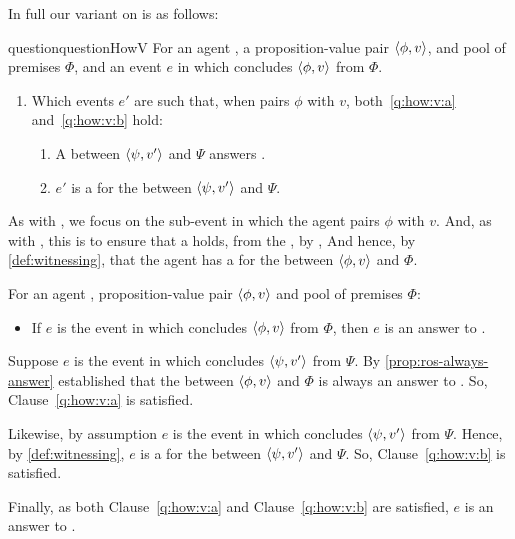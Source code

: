\begin{note}
  In full our variant on \qHow{} is as follows:

  \begin{restatable}[\qHowV{}]{question}{questionHowV}
    \label{q:how:v}
    For an agent \vAgent{}, a proposition-value pair \(\langle \phi, v \rangle\), and pool of premises \(\Phi\), and an event \(e\) in which \vAgent{} concludes \(\langle \phi, v \rangle\) from \(\Phi\).

    \begin{enumerate}[label=]
    \item
      Which events \(e'\) are such that, when \vAgent{} pairs \(\phi\) with \(v\), both~\ref{q:how:v:a} and~\ref{q:how:v:b} hold:
      \begin{enumerate}[label=\alph*., ref=(\alph*), , series=qHowVdef]
      \item
        \label{q:how:v:a}
        A \ros{} between \(\langle \psi, v' \rangle\) and \(\Psi\) answers \qWhyVnP{}.
      \item
        \label{q:how:v:b}
        \(e'\) is a  for the \ros{} between \(\langle \psi, v' \rangle\) and \(\Psi\).
      \end{enumerate}
    \end{enumerate}
    \vspace{-\baselineskip}
  \end{restatable}

  As with \qWhyVnP{}, we focus on the sub-event in which the agent pairs \(\phi\) with \(v\).
  And, as with \qWhyVnP{}, this is to ensure that a \ros{} holds, from the \agpe{}, by \supportI{},
  And hence, by \autoref{def:witnessing}, that the agent has a \wit{} for the \ros{} between \(\langle \phi, v \rangle\) and \(\Phi\).

  \begin{proposition}
    \label{prop:phi-always-how}
    For an agent \vAgent{}, proposition-value pair \(\langle \phi, v \rangle\) and pool of premises \(\Phi\):

    \begin{itemize}
    \item
      If \(e\) is the event in which \vAgent{} concludes \(\langle \phi, v \rangle\) from \(\Phi\), then \(e\) is an answer to \qHowV{}.
    \end{itemize}
    \begin{argument}
      Suppose \(e\) is the event in which \vAgent{} concludes \(\langle \psi, v' \rangle\) from \(\Psi\).
      By \autoref{prop:ros-always-answer} established that the \ros{} between \(\langle \phi, v \rangle\) and \(\Phi\) is always an answer to \qWhyVnP{}.
      So, Clause~\ref{q:how:v:a} is satisfied.

      Likewise, by assumption \(e\) is the event in which \vAgent{} concludes \(\langle \psi, v' \rangle\) from \(\Psi\).
      Hence, by \autoref{def:witnessing}, \(e\) is a \wit{} for the \ros{} between \(\langle \psi, v' \rangle\) and \(\Psi\).
      So, Clause~\ref{q:how:v:b} is satisfied.

      Finally, as both Clause~\ref{q:how:v:a} and Clause~\ref{q:how:v:b} are satisfied, \(e\) is an answer to \qHowV{}.
    \end{argument}
  \end{proposition}
\end{note}


